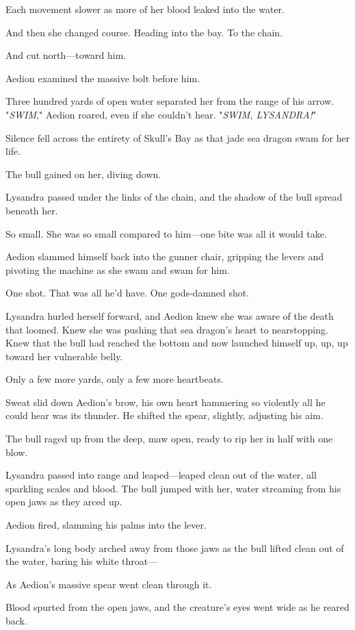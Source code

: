 Each movement slower as more of her blood leaked into the water.

And then she changed course.
Heading into the bay.
To the chain.

And cut north---toward him.

Aedion examined the massive bolt before him.

Three hundred yards of open water separated her from the range of his arrow.
"\emph{SWIM}," Aedion roared, even if she couldn't hear.
"\emph{SWIM, LYSANDRA!}"

Silence fell across the entirety of Skull's Bay as that jade sea dragon swam for her life.

The bull gained on her, diving down.

Lysandra passed under the links of the chain, and the shadow of the bull spread beneath her.

So small.
She was so small compared to him---one bite was all it would take.

Aedion slammed himself back into the gunner chair, gripping the levers and pivoting the machine as she swam and swam for him.

One shot.
That was all he'd have.
One gods-damned shot.

Lysandra hurled herself forward, and Aedion knew she was aware of the death that loomed.
Knew she was pushing that sea dragon's heart to nearstopping.
Knew that the bull had reached the bottom and now launched himself up, up, up toward her vulnerable belly.

Only a few more yards, only a few more heartbeats.

Sweat slid down Aedion's brow, his own heart hammering so violently all he could hear was its thunder.
He shifted the spear, slightly, adjusting his aim.

The bull raged up from the deep, maw open, ready to rip her in half with one blow.

Lysandra passed into range and leaped---leaped clean out of the water, all sparkling scales and blood.
The bull jumped with her, water streaming from his open jaws as they arced up.

Aedion fired, slamming his palms into the lever.

Lysandra's long body arched away from those jaws as the bull lifted clean out of the water, baring his white throat---

As Aedion's massive spear went clean through it.

Blood spurted from the open jaws, and the creature's eyes went wide as he reared back.

